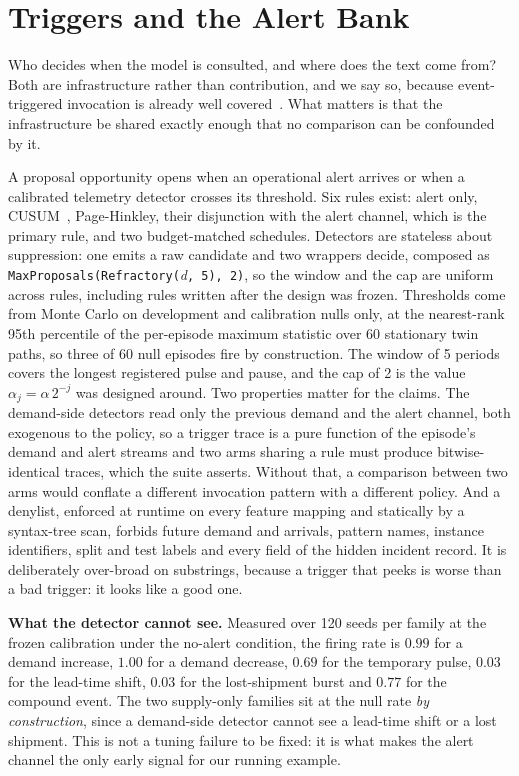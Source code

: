 \section{Triggers and the Alert Bank}
\label{sec:triggers}

Who decides when the model is consulted, and where does the text come from? Both
are infrastructure rather than contribution, and we say so, because
event-triggered invocation is already well covered~\cite{event-triggered-llm}.
What matters is that the infrastructure be shared exactly enough that no
comparison can be confounded by it.

A proposal opportunity opens when an operational alert arrives or when a
calibrated telemetry detector crosses its threshold. Six rules exist: alert only,
CUSUM~\cite{page-cusum}, Page-Hinkley, their disjunction with the alert channel,
which is the primary rule, and two budget-matched schedules. Detectors are
stateless about suppression: one emits a raw candidate and two wrappers decide,
composed as \texttt{MaxProposals(Refractory(}\textit{d}\texttt{, 5), 2)}, so the
window and the cap are uniform across rules, including rules written after the
design was frozen. Thresholds come from Monte Carlo on development and
calibration nulls only, at the nearest-rank 95th percentile of the per-episode
maximum statistic over 60 stationary twin paths, so three of 60 null episodes
fire by construction. The window of 5 periods covers the longest registered pulse
and pause, and the cap of 2 is the value $\alpha_j = \alpha\,2^{-j}$ was designed
around. Two properties matter for the claims. The demand-side detectors read only the
previous demand and the alert channel, both exogenous to the policy, so a trigger
trace is a pure function of the episode's demand and alert streams and two arms
sharing a rule must produce bitwise-identical traces, which the suite asserts.
Without that, a comparison between two arms would conflate a different invocation
pattern with a different policy. And a denylist, enforced at runtime on
every feature mapping and statically by a syntax-tree scan, forbids future demand
and arrivals, pattern names, instance identifiers, split and test labels and every
field of the hidden incident record. It is deliberately over-broad on substrings,
because a trigger that peeks is worse than a bad trigger: it looks like a good
one.

\textbf{What the detector cannot see.} Measured over 120 seeds per family at the
frozen calibration under the no-alert condition, the firing rate is $0.99$ for a
demand increase, $1.00$ for a demand decrease, $0.69$ for the temporary pulse,
$0.03$ for the lead-time shift, $0.03$ for the lost-shipment burst and $0.77$ for
the compound event. The two supply-only families sit at the null rate \emph{by
construction}, since a demand-side detector cannot see a lead-time shift or a
lost shipment. This is not a tuning failure to be fixed: it is what makes the
alert channel the only early signal for our running example.

